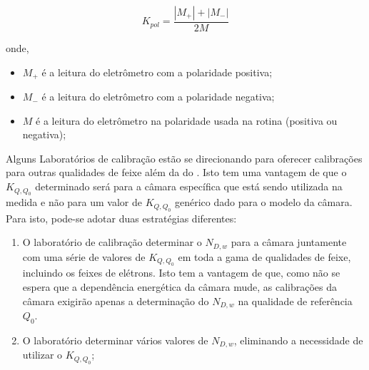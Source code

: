 \documentclass[11pt,a4paper]{article}
\newcounter{exemplo}
\begin{document}
	\begin{exemplo}

			$$K_{pol} = \frac{\left\lvert M_+ \right\rvert + \left\lvert M_- \right\rvert }{2M}$$

			onde,
			\begin{itemize}[label=\textcolor{CarnationPink}{$\star$}]
				\item $M_+$ é a leitura do eletrômetro com a polaridade positiva;
				\item $M_-$ é a leitura do eletrômetro com a polaridade negativa;
				\item $M$ é a leitura do eletrômetro na polaridade usada na rotina (positiva ou negativa);
			\end{itemize}

		
	\end{exemplo}
	



	Alguns Laboratórios de calibração estão se direcionando para oferecer calibrações para outras qualidades de feixe além da do . Isto tem uma vantagem de que o $K_{Q,Q_0}$ determinado será para a câmara específica que está sendo utilizada na medida e não para um valor de $K_{Q,Q_0}$ genérico dado para o modelo da câmara. Para isto, pode-se adotar duas estratégias diferentes:

	\begin{enumerate}
		\item O laboratório de calibração determinar o $N_{D,w}$ para a câmara juntamente com uma série de valores de $K_{Q,Q_0}$ em toda a gama de qualidades de feixe, incluindo os feixes de elétrons. Isto tem a vantagem de que, como não se espera que a dependência energética da câmara mude, as calibrações da câmara exigirão apenas a determinação do $N_{D,w}$ na qualidade de referência $Q_0$.
		\item O laboratório determinar vários valores de $N_{D,w}$, eliminando a necessidade de utilizar o $K_{Q,Q_0}$;
	\end{enumerate}












\end{document}
